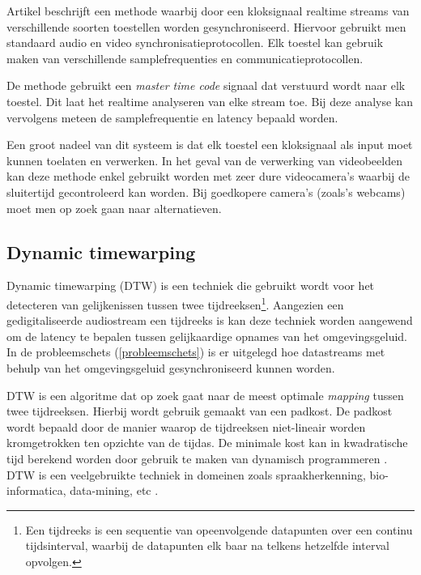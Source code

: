 Artikel \cite{jaimovich2010synchronization} beschrijft een methode waarbij door een kloksignaal realtime streams van verschillende soorten toestellen worden gesynchroniseerd. Hiervoor gebruikt men standaard audio en video synchronisatieprotocollen. Elk toestel kan gebruik maken van verschillende samplefrequenties en communicatieprotocollen.

De methode gebruikt een \textit{master time code} signaal dat verstuurd wordt naar elk toestel. Dit laat het realtime analyseren van elke stream toe. Bij deze analyse kan vervolgens meteen de samplefrequentie en latency bepaald worden. 

Een groot nadeel van dit systeem is dat elk toestel een kloksignaal als input moet kunnen toelaten en verwerken. In het geval van de verwerking van videobeelden kan deze methode enkel gebruikt worden met zeer dure videocamera's waarbij de sluitertijd gecontroleerd kan worden. Bij goedkopere camera's (zoals's webcams) moet men op zoek gaan naar alternatieven. \cite{six2015multimodal}



\subsection{Dynamic timewarping}

Dynamic timewarping (DTW) is een techniek die gebruikt wordt voor het detecteren van gelijkenissen tussen twee tijdreeksen\footnote{Een tijdreeks is een sequentie van opeenvolgende datapunten over een continu tijdsinterval, waarbij de datapunten elk baar na telkens hetzelfde interval opvolgen.}. Aangezien een gedigitaliseerde audiostream een tijdreeks is kan deze techniek worden aangewend om de latency te bepalen tussen gelijkaardige opnames van het omgevingsgeluid. In de probleemschets (\ref{probleemschets}) is er uitgelegd hoe datastreams met behulp van het omgevingsgeluid gesynchroniseerd kunnen worden.

DTW is een algoritme dat op zoek gaat naar de meest optimale \textit{mapping} tussen twee tijdreeksen. Hierbij wordt gebruik gemaakt van een padkost. De padkost wordt bepaald door de manier waarop de tijdreeksen niet-lineair worden kromgetrokken ten opzichte van de tijdas\cite{salvador2007toward}. De minimale kost kan in kwadratische tijd berekend worden door gebruik te maken van dynamisch programmeren \cite{dixon2005live}. DTW is een veelgebruikte techniek in domeinen zoals spraakherkenning, bio-informatica, data-mining, etc \cite{ratanamahatana2004everything}.


